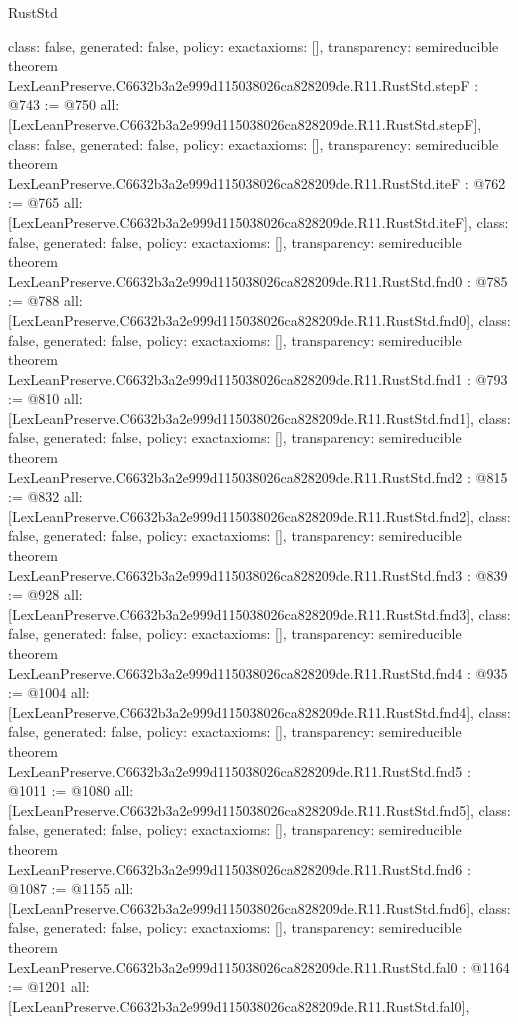 \begin{lexlean}{RustStd}
\begin{coremodule}
{  class: false,
  generated: false,
  policy: exact{axioms: []},
  transparency: semireducible
}
theorem LexLeanPreserve.C6632b3a2e999d115038026ca828209de.R11.RustStd.stepF : @743 := @750 {
  all: [LexLeanPreserve.C6632b3a2e999d115038026ca828209de.R11.RustStd.stepF],
  class: false,
  generated: false,
  policy: exact{axioms: []},
  transparency: semireducible
}
theorem LexLeanPreserve.C6632b3a2e999d115038026ca828209de.R11.RustStd.iteF : @762 := @765 {
  all: [LexLeanPreserve.C6632b3a2e999d115038026ca828209de.R11.RustStd.iteF],
  class: false,
  generated: false,
  policy: exact{axioms: []},
  transparency: semireducible
}
theorem LexLeanPreserve.C6632b3a2e999d115038026ca828209de.R11.RustStd.fnd0 : @785 := @788 {
  all: [LexLeanPreserve.C6632b3a2e999d115038026ca828209de.R11.RustStd.fnd0],
  class: false,
  generated: false,
  policy: exact{axioms: []},
  transparency: semireducible
}
theorem LexLeanPreserve.C6632b3a2e999d115038026ca828209de.R11.RustStd.fnd1 : @793 := @810 {
  all: [LexLeanPreserve.C6632b3a2e999d115038026ca828209de.R11.RustStd.fnd1],
  class: false,
  generated: false,
  policy: exact{axioms: []},
  transparency: semireducible
}
theorem LexLeanPreserve.C6632b3a2e999d115038026ca828209de.R11.RustStd.fnd2 : @815 := @832 {
  all: [LexLeanPreserve.C6632b3a2e999d115038026ca828209de.R11.RustStd.fnd2],
  class: false,
  generated: false,
  policy: exact{axioms: []},
  transparency: semireducible
}
theorem LexLeanPreserve.C6632b3a2e999d115038026ca828209de.R11.RustStd.fnd3 : @839 := @928 {
  all: [LexLeanPreserve.C6632b3a2e999d115038026ca828209de.R11.RustStd.fnd3],
  class: false,
  generated: false,
  policy: exact{axioms: []},
  transparency: semireducible
}
theorem LexLeanPreserve.C6632b3a2e999d115038026ca828209de.R11.RustStd.fnd4 : @935 := @1004 {
  all: [LexLeanPreserve.C6632b3a2e999d115038026ca828209de.R11.RustStd.fnd4],
  class: false,
  generated: false,
  policy: exact{axioms: []},
  transparency: semireducible
}
theorem LexLeanPreserve.C6632b3a2e999d115038026ca828209de.R11.RustStd.fnd5 : @1011 := @1080 {
  all: [LexLeanPreserve.C6632b3a2e999d115038026ca828209de.R11.RustStd.fnd5],
  class: false,
  generated: false,
  policy: exact{axioms: []},
  transparency: semireducible
}
theorem LexLeanPreserve.C6632b3a2e999d115038026ca828209de.R11.RustStd.fnd6 : @1087 := @1155 {
  all: [LexLeanPreserve.C6632b3a2e999d115038026ca828209de.R11.RustStd.fnd6],
  class: false,
  generated: false,
  policy: exact{axioms: []},
  transparency: semireducible
}
theorem LexLeanPreserve.C6632b3a2e999d115038026ca828209de.R11.RustStd.fal0 : @1164 := @1201 {
  all: [LexLeanPreserve.C6632b3a2e999d115038026ca828209de.R11.RustStd.fal0],
}
\end{coremodule}
\end{lexlean}

